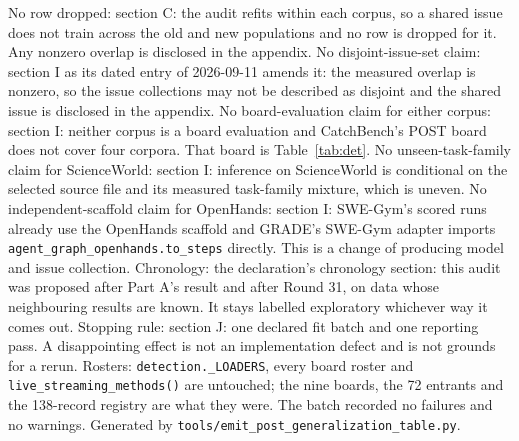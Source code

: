 No row dropped: section C: the audit refits within each corpus, so a shared issue does not train across the old and new populations and no row is dropped for it. Any nonzero overlap is disclosed in the appendix.
No disjoint-issue-set claim: section I as its dated entry of 2026-09-11 amends it: the measured overlap is nonzero, so the issue collections may not be described as disjoint and the shared issue is disclosed in the appendix.
No board-evaluation claim for either corpus: section I: neither corpus is a board evaluation and CatchBench's POST board does not cover four corpora. That board is Table~\ref{tab:det}.
No unseen-task-family claim for ScienceWorld: section I: inference on ScienceWorld is conditional on the selected source file and its measured task-family mixture, which is uneven.
No independent-scaffold claim for OpenHands: section I: SWE-Gym's scored runs already use the OpenHands scaffold and GRADE's SWE-Gym adapter imports \texttt{agent\_graph\_openhands.to\_steps} directly. This is a change of producing model and issue collection.
Chronology: the declaration's chronology section: this audit was proposed after Part A's result and after Round 31, on data whose neighbouring results are known. It stays labelled exploratory whichever way it comes out.
Stopping rule: section J: one declared fit batch and one reporting pass. A disappointing effect is not an implementation defect and is not grounds for a rerun.
Rosters: \texttt{detection.\_LOADERS}, every board roster and \texttt{live\_streaming\_methods()} are untouched; the nine boards, the 72 entrants and the 138-record registry are what they were.
The batch recorded no failures and no warnings.
Generated by \texttt{tools/emit\_post\_generalization\_table.py}.

